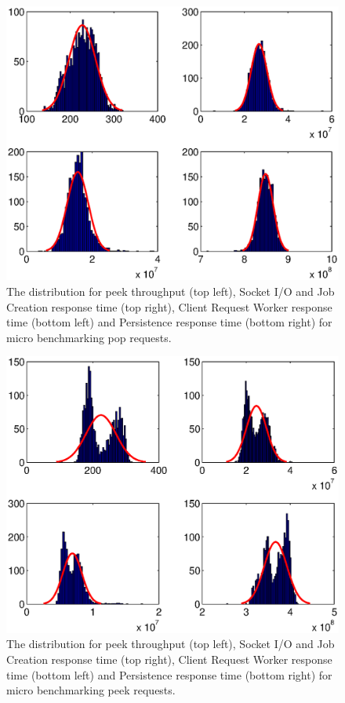 \documentclass{article}
\begin{document}
        \begin{figure}[hbtp]
        \centering
        \centerline{\includegraphics[scale=0.5]{img/histfit_pop_io_crw_db}}
        \caption{The distribution for peek throughput (top left), Socket I/O and Job Creation response time (top right), Client Request Worker response time (bottom left) and Persistence response time (bottom right) for micro benchmarking pop requests.}
        \end{figure}
        
        \begin{figure}[hbtp]
        \centering
        \centerline{\includegraphics[scale=0.5]{img/histfit_1_push_io_crw_db}}
        \caption{The distribution for peek throughput (top left), Socket I/O and Job Creation response time (top right), Client Request Worker response time (bottom left) and Persistence response time (bottom right) for micro benchmarking peek requests.}
        \end{figure}
        
\end{document}

